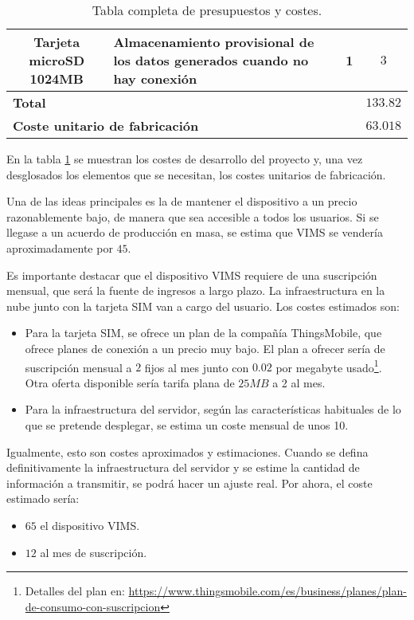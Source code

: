 \begin{table}[H]
\begin{tabularx}{\textwidth}{|c|X|c|c|}
    Tarjeta microSD 1024MB                                       & Almacenamiento provisional de los datos generados cuando no hay conexión & 1                 & $3$\EUR{}            \\
    \hline
    \hline
    \multicolumn{3}{|l|}{\textbf{Total}}                         & $133.82$\EUR{}                                                                                                      \\
    \hline
    \multicolumn{3}{|l|}{\textbf{Coste unitario de fabricación}} & $63.018$\EUR{}                                                                                                      \\
    \hline
  \end{tabularx}
  \caption{Tabla completa de presupuestos y costes.}
  \label{tab:costs}
\end{table}

En la tabla \ref{tab:costs} se muestran los costes de desarrollo del proyecto
y, una vez desglosados los elementos que se necesitan, los costes unitarios
de fabricación.

Una de las ideas principales es la de mantener el dispositivo a un
precio razonablemente bajo, de manera que sea accesible a todos los usuarios.
Si se llegase a un acuerdo de producción en masa, se estima que \ac{VIMS}
se vendería aproximadamente por $45$\EUR{}.

Es importante destacar que el dispositivo \ac{VIMS} requiere de una suscripción
mensual, que será la fuente de ingresos a largo plazo. La infraestructura
en la nube junto con la tarjeta SIM van a cargo del usuario. Los costes
estimados son:

\begin{itemize}
  \item Para la tarjeta SIM, se ofrece un plan de la compañía ThingsMobile,
        que ofrece planes de conexión a un precio muy bajo. El plan a
        ofrecer sería de suscripción mensual a $2$\EUR{} fijos al mes junto con
        $0.02$\EUR{} por megabyte usado\footnote{Detalles del plan en: \url{https://www.thingsmobile.com/es/business/planes/plan-de-consumo-con-suscripcion}}.
        Otra oferta disponible sería tarifa plana de $25MB$ a 2\EUR{} al mes.
  \item Para la infraestructura del servidor, según las características
        habituales de lo que se pretende desplegar, se estima un coste
        mensual de unos 10\EUR{}.
\end{itemize}

Igualmente, esto son costes aproximados y estimaciones. Cuando se defina
definitivamente la infraestructura del servidor y se estime la cantidad
de información a transmitir, se podrá hacer un ajuste real. Por ahora,
el coste estimado sería:

\begin{itemize}
  \item $65$\EUR{} el dispositivo \ac{VIMS}.
  \item $12$\EUR{} al mes de suscripción.
\end{itemize}
